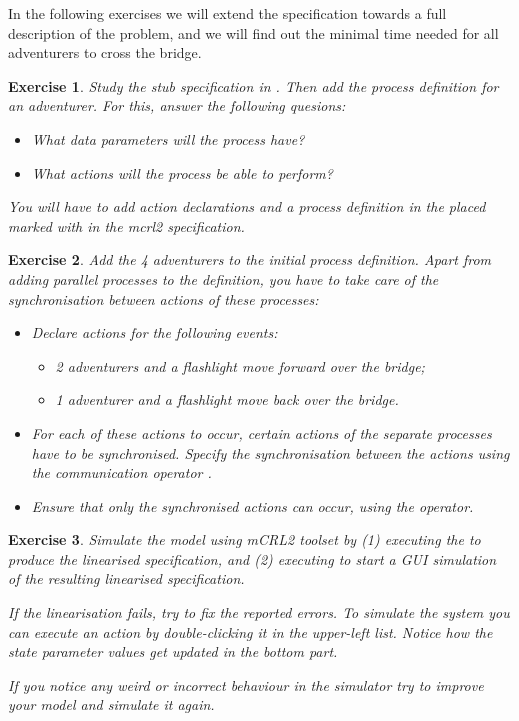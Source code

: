 \documentclass[11pt]{article}
\theoremstyle{myplain}
\newtheorem{exercise}{Exercise}
\theoremstyle{definition} %
\begin{document}
In the following exercises we will extend the specification towards a full description of the problem, and we will find out the minimal time needed for all adventurers to cross the bridge.


\begin{exercise}
Study the stub specification in . Then add the process definition for an adventurer. For this, answer the following quesions:
\begin{itemize}
  \item What data parameters will the process have?
  \item What actions will the process be able to perform?
\end{itemize} 
You will have to add action declarations and a process definition in the placed marked with  in the mcrl2 specification.
\end{exercise}


\begin{exercise}
Add the 4 adventurers to the initial process definition. Apart from adding parallel processes to the definition, you have to take care of the synchronisation between actions of these processes:
\begin{itemize}
  \item Declare actions for the following events:
  \begin{itemize}
    \item 2 adventurers and a flashlight move forward over the bridge;
    \item 1 adventurer and a flashlight move back over the bridge.
  \end{itemize}
  \item For each of these actions to occur, certain actions of the separate processes have to be synchronised. Specify the synchronisation between the actions using the communication operator .
  \item Ensure that only the synchronised actions can occur, using the  operator.
\end{itemize}
\end{exercise}
 
 
\begin{exercise}
Simulate the model using mCRL2 toolset by (1) executing the  to produce the linearised specification, and (2) executing  to start a GUI simulation of the resulting linearised specification.

If the linearisation fails, try to fix the reported errors.
To simulate the system you can execute an action by double-clicking it in the upper-left list. Notice how the state parameter values get updated in the bottom part.

If you notice any weird or incorrect behaviour in the simulator try to improve your model and simulate it again.
\end{exercise}
\end{document}
